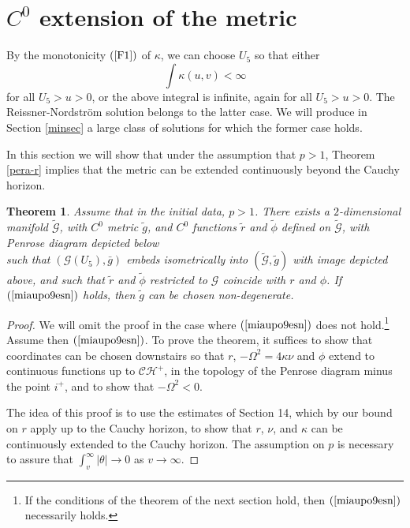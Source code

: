 \documentclass{article}
\newtheorem{theorem}{Theorem}[section]
\begin{document}
{\section{$C^0$ extension of the metric}
\label{c0esec}
By the monotonicity $(\ref{F1})$ of $\kappa$,
we can choose $U_5$ so that 
either
\begin{equation}
\label{miaupo9esn}
\int{\kappa(u,v)}<\infty
\end{equation}
for all $U_5>u>0$, or the above integral is infinite,
again
for all $U_5>u>0$. 
The Reissner-Nordstr\"om solution belongs to the
latter case. We will produce in Section \ref{minsec}
a large class of solutions for which the former case holds.

In this section we will show that under the assumption
that $p>1$,
Theorem \ref{pera-r} implies that the metric
can be extended continuously beyond the Cauchy
horizon. 

\begin{theorem}
Assume that in the initial data, $p>1$. 
There exists a $2$-dimensional manifold $\tilde{\mathcal{G}}$, with $C^0$ metric
$\tilde{g}$, and $C^0$ functions $\tilde{r}$ and $\tilde{\phi}$ defined
on $\tilde{\mathcal{G}}$, 
with Penrose diagram 
depicted below
\[

\]
such that $(\mathcal{G}(U_5),\bar{g})$ embeds isometrically 
into $(\tilde{\mathcal{G}},\tilde{g})$ 
with image depicted above, and 
such that $\tilde{r}$ and $\tilde{\phi}$ restricted to 
$\mathcal{G}$
coincide with $r$ and $\phi$. If $(\ref{miaupo9esn})$ holds, then
$\tilde{g}$ can be chosen non-degenerate.
\end{theorem}
\begin{proof}
We will omit the proof in the
case where $(\ref{miaupo9esn})$ does not hold.\footnote{If
the conditions of the theorem of the next section hold,
then $(\ref{miaupo9esn})$ necessarily holds.}
Assume then $(\ref{miaupo9esn})$. To prove the theorem,
it suffices to show that coordinates
can be chosen 
downstairs so that $r$, $-\Omega^2=4\kappa\nu$ and $\phi$
extend to continuous functions up to $\mathcal{CH}^+$,
in the topology of the Penrose diagram minus the point
$i^+$, and to show that $-\Omega^2<0$.

The idea of this proof is to use the estimates of Section 14, which
by our bound on $r$ apply up to the Cauchy horizon,
to show that $r$, $\nu$, and $\kappa$ can be
continuously extended to the Cauchy horizon. The assumption
on $p$ is necessary to assure that $\int_v^\infty|\theta|\to0$
as $v\to\infty$. 


\end{proof}}
\end{document}
